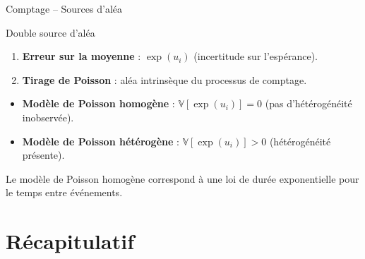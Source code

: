 \documentclass[11pt,aspectratio=169]{beamer}
\newcommand{\Var}{\mathbb{V}}
\begin{document}
\begin{frame}{Comptage -- Sources d'aléa}

\begin{alertblock}{Double source d'aléa}
\begin{enumerate}
\item \textbf{Erreur sur la moyenne} : $\exp(u_i)$ (incertitude sur l'espérance).
\item \textbf{Tirage de Poisson} : aléa intrinsèque du processus de comptage.
\end{enumerate}
\end{alertblock}

\vspace{0.3cm}

\begin{itemize}

\item \textbf{Modèle de Poisson homogène} : $\Var[\exp(u_i)] = 0$ (pas d'hétérogénéité inobservée).\newline

\item \textbf{Modèle de Poisson hétérogène} : $\Var[\exp(u_i)] > 0$ (hétérogénéité présente).

\end{itemize}

\vspace{0.3cm}

Le modèle de Poisson homogène correspond à une loi de durée exponentielle pour le temps entre événements.

\end{frame}

\section{Récapitulatif}
\end{document}
